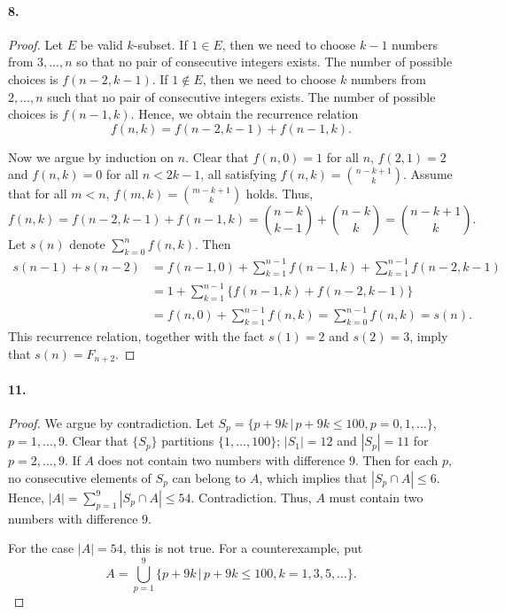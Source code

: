   \paragraph{8.}
  \begin{proof}
    Let $E$ be valid $k$-subset. If $1\in  E$, then we need to choose $k-1$
    numbers from $3,\dots,n$ so that no pair of consecutive integers exists. 
    The number of possible choices is $f(n-2,k-1)$. If $1\notin E$, then we 
    need to choose $k$ numbers from $2,\dots,n$ such that no pair of 
    consecutive integers exists. The number of possible choices is $f(n-1,k)$.
    Hence, we obtain the recurrence relation
    \[
      f(n,k)=f(n-2,k-1)+f(n-1,k).
    \]\par
    Now we argue by induction on $n$. Clear that $f(n,0)=1$ for all $n$, 
    $f(2,1)=2$ and $f(n,k)=0$ for all $n<2k-1$, all satisfying $f(n,k)=
    \binom{n-k+1}{k}$. Assume that for all $m<n$, $f(m,k)=\binom{m-k+1}{k}$ 
    holds. Thus,
    \[
      f(n,k)=f(n-2,k-1)+f(n-1,k)=
      \binom{n-k}{k-1}+\binom{n-k}{k}=\binom{n-k+1}{k}.
    \]
    Let $s(n)$ denote $\sum_{k=0}^nf(n,k)$. Then
    \begin{align*}
      s(n-1)+s(n-2)
      &=f(n-1,0)+\sum_{k=1}^{n-1}f(n-1,k)+\sum_{k=1}^{n-1}f(n-2,k-1) \\
      &=1+\sum_{k=1}^{n-1}\{f(n-1,k)+f(n-2,k-1)\} \\
      &= f(n,0)+\sum_{k=1}^{n-1}f(n,k)=\sum_{k=0}^{n-1}f(n,k)=s(n).
    \end{align*}
    This recurrence relation, together with the fact $s(1)=2$ and $s(2)=3$, 
    imply that $s(n)=F_{n+2}$.
  \end{proof}
  
  \paragraph{11.}
  \begin{proof}
    We argue by contradiction. Let $S_p=\{p+9k\,|\,p+9k\le 100, p=0,1,\dots\}$, 
    $p=1,\dots,9$. Clear that $\{S_p\}$ partitions $\{1,\dots,100\}$; $|S_1|
    =12$ and $|S_p|=11$ for $p=2,\dots,9$. If $A$ does not contain two numbers 
    with difference $9$. Then for each $p$, no consecutive elements of $S_p$ 
    can belong to $A$, which implies that $|S_p\cap A|\le 6$. Hence, $|A|=
    \sum_{p=1}^9|S_p\cap A|\le 54$. Contradiction. Thus, $A$ must contain two
    numbers with difference $9$.\par
    For the case $|A|=54$, this is not true. For a counterexample, put
    \[
      A=\bigcup_{p=1}^9\{p+9k\,|\,p+9k\le 100, k=1,3,5,\dots\}.
    \]
  \end{proof}
